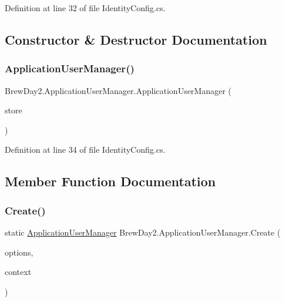 Definition at line 32 of file Identity\+Config.\+cs.



\subsection{Constructor \& Destructor Documentation}
\mbox{\label{class_brew_day2_1_1_application_user_manager_af0cbb46137f5ab4bde7c3aaae35fd7b5}} 
\subsubsection{\texorpdfstring{Application\+User\+Manager()}{ApplicationUserManager()}}
{\footnotesize\ttfamily Brew\+Day2.\+Application\+User\+Manager.\+Application\+User\+Manager (\begin{DoxyParamCaption}\item[{I\+User\+Store$<$ \mbox{\hyperlink{class_brew_day2_1_1_models_1_1_application_user}{Application\+User}} $>$}]{store }\end{DoxyParamCaption})}



Definition at line 34 of file Identity\+Config.\+cs.



\subsection{Member Function Documentation}
\mbox{\label{class_brew_day2_1_1_application_user_manager_a3d7b87794f38aad3901618bbdb909b91}} 
\subsubsection{\texorpdfstring{Create()}{Create()}}
{\footnotesize\ttfamily static \mbox{\hyperlink{class_brew_day2_1_1_application_user_manager}{Application\+User\+Manager}} Brew\+Day2.\+Application\+User\+Manager.\+Create (\begin{DoxyParamCaption}\item[{Identity\+Factory\+Options$<$ \mbox{\hyperlink{class_brew_day2_1_1_application_user_manager}{Application\+User\+Manager}} $>$}]{options,  }\item[{I\+Owin\+Context}]{context }\end{DoxyParamCaption})\hspace{0.3cm}{\ttfamily [static]}}



